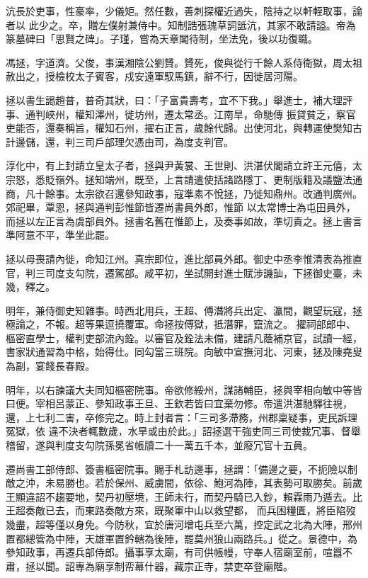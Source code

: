 \begin{pinyinscope}
 沆長於吏事，性豪率，少儀矩。然任數，善刺探權近過失，陰持之以軒輊取事，論者以
 此少之。卒，贈左僕射兼侍中。知制誥張瑰草詞詆沆，其家不敢請謚。帝為篆墓碑曰「思賢之碑」。子瑾，嘗為天章閣待制，坐法免，後以功復職。



 馮拯，字道濟。父俊，事漢湘陰公劉贇。贇死，俊與從行千餘人系侍衛獄，周太祖赦出之，授檢校太子賓客，戍安遠軍馭馬鎮，辭不行，因徙居河陽。



 拯以書生謁趙普，普奇其狀，曰：「子富貴壽考，宜不下我。」舉進士，補大理評事、通判峽州，權知澤州，徙坊州，遷太常丞。江南旱，命馳傳
 振貸貧乏，察官吏能否，還奏稱旨，權知石州，擢右正言，歲餘代歸。出使河北，與轉運使樊知古計邊儲，還，判三司戶部理欠憑由司，為度支判官。



 淳化中，有上封請立皇太子者，拯與尹黃裳、王世則、洪湛伏閣請立許王元僖，太宗怒，悉貶嶺外。拯知端州，既至，上言請遣使括諸路隱丁、更制版籍及議鹽法通商，凡十餘事。太宗欲召還參知政事，寇準素不悅拯，乃徙知鼎州。改通判廣州。郊祀畢，覃恩，拯與通判彭惟節皆遷尚書員外郎，惟節
 以太常博士為屯田員外，而拯以左正言為虞部員外。拯書名舊在惟節上，及奏事如故，準切責之。拯上書言準阿意不平，準坐此罷。



 拯以母喪請內徙，命知江州。真宗即位，進比部員外郎。御史中丞李惟清表為推直官，判三司度支勾院，遷駕部。咸平初，坐試開封進士賦涉譏訕，下拯御史臺，未幾，釋之。



 明年，兼侍御史知雜事。時西北用兵，王超、傅潛將兵出定、瀛間，觀望玩寇，拯極論之，不報。超等果逗撓覆軍。命拯按傅獄，抵潛罪，竄流之。
 擢祠部郎中、樞密直學士，權判吏部流內銓。以審官及銓法未備，建請凡蔭補京官，試讀一經，書家狀通習為中格，始得仕。同勾當三班院。向敏中宣撫河北、河東，拯及陳堯叟為副，宴餞長春殿。



 明年，以右諫議大夫同知樞密院事。帝欲修綏州，謀諸輔臣，拯與宰相向敏中等皆曰便。宰相呂蒙正、參知政事王旦、王欽若皆曰宜棄勿修。帝遣洪湛馳驛往視，還，上七利二害，卒修完之。時上封者言：「三司多滯務，州郡稟疑事，吏民訴理冤獄，依
 違不決者輒數歲，水旱或由於此。」詔拯選干強吏同三司使裁冗事、督舉稽留，遂與判度支勾院孫冕省帳牘二十一萬五千本，並廢冗官十五員。



 遷尚書工部侍郎、簽書樞密院事。賜手札訪邊事，拯謂：「備邊之要，不扼險以制敵之沖，未易勝也。若於保州、威虜間，依徐、鮑河為陣，其表勢可取勝矣。前歲王顯違詔不趨要地，契丹初壓境，王師未行，而契丹騎已入鈔，賴霖雨乃遁去。比王超奏敵已去，而東路奏敵方來，既聚軍中山以救望都，
 而兵困糧匱，將臣陷歿幾盡，超等僅以身免。今防秋，宜於唐河增屯兵至六萬，控定武之北為大陣，邢州置都總管為中陣，天雄軍置鈐轄為後陣，罷莫州狼山兩路兵。」從之。景德中，為參知政事，再遷兵部侍郎。攝事享太廟，有司供帳幔，守奉人宿廟室前，喧囂不肅，拯以聞。詔專為廟享制帟幕什器，藏宗正寺，禁吏卒登廟階。




\end{pinyinscope}
